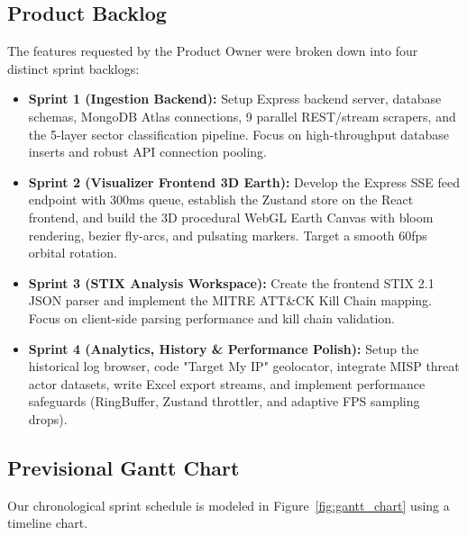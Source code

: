 \subsection{Product Backlog}
The features requested by the Product Owner were broken down into four distinct sprint backlogs:
\begin{itemize}
    \item \textbf{Sprint 1 (Ingestion Backend):} Setup Express backend server, database schemas, MongoDB Atlas connections, 9 parallel REST/stream scrapers, and the 5-layer sector classification pipeline. Focus on high-throughput database inserts and robust API connection pooling.
    \item \textbf{Sprint 2 (Visualizer Frontend 3D Earth):} Develop the Express SSE feed endpoint with 300ms queue, establish the Zustand store on the React frontend, and build the 3D procedural WebGL Earth Canvas with bloom rendering, bezier fly-arcs, and pulsating markers. Target a smooth 60fps orbital rotation.
    \item \textbf{Sprint 3 (STIX Analysis Workspace):} Create the frontend STIX 2.1 JSON parser and implement the MITRE ATT\&CK Kill Chain mapping. Focus on client-side parsing performance and kill chain validation.
    \item \textbf{Sprint 4 (Analytics, History \& Performance Polish):} Setup the historical log browser, code "Target My IP" geolocator, integrate MISP threat actor datasets, write Excel export streams, and implement performance safeguards (RingBuffer, Zustand throttler, and adaptive FPS sampling drops).
\end{itemize}

\subsection{Previsional Gantt Chart}
Our chronological sprint schedule is modeled in Figure~\ref{fig:gantt_chart} using a timeline chart.

